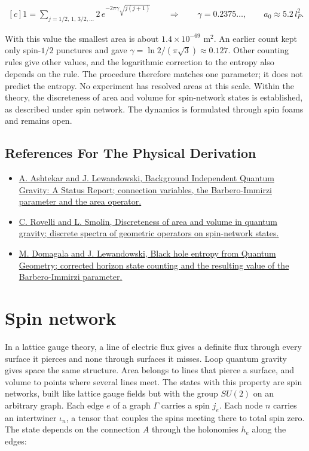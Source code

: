 \documentclass[11pt,oneside]{book}
\newenvironment{centeredalign}{\[\begin{gathered}[c]}{\end{gathered}\]}
\begin{document}
\begin{centeredalign}
1=\sum_{j=1/2,\,1,\,3/2,\ldots}2\,e^{-2\pi\gamma\sqrt{j(j+1)}}
\qquad\Rightarrow\qquad \gamma=0.2375\ldots,\qquad a_0\approx5.2\,l_P^2.
\end{centeredalign}

With this value the smallest area is about \(1.4\times10^{-69}\) m\(^2\). An earlier count kept only spin-\(1/2\) punctures and gave \(\gamma=\ln2/(\pi\sqrt3)\approx0.127\). Other counting rules give other values, and the logarithmic correction to the entropy also depends on the rule. The procedure therefore matches one parameter; it does not predict the entropy. No experiment has resolved areas at this scale. Within the theory, the discreteness of area and volume for spin-network states is established, as described under spin network. The dynamics is formulated through spin foams and remains open.

\subsection*{References For The Physical Derivation}
\begin{itemize}
\item \href{https://arxiv.org/abs/gr-qc/0404018}{A. Ashtekar and J. Lewandowski, Background Independent Quantum Gravity: A Status Report; connection variables, the Barbero-Immirzi parameter and the area operator.}
\item \href{https://arxiv.org/abs/gr-qc/9411005}{C. Rovelli and L. Smolin, Discreteness of area and volume in quantum gravity; discrete spectra of geometric operators on spin-network states.}
\item \href{https://arxiv.org/abs/gr-qc/0407051}{M. Domagala and J. Lewandowski, Black hole entropy from Quantum Geometry; corrected horizon state counting and the resulting value of the Barbero-Immirzi parameter.}
\end{itemize}





\clearpage

\section{Spin network}

\label{topic:spin-network}

In a lattice gauge theory, a line of electric flux gives a definite flux through every surface it pierces and none through surfaces it misses. Loop quantum gravity gives space the same structure. Area belongs to lines that pierce a surface, and volume to points where several lines meet. The states with this property are spin networks, built like lattice gauge fields but with the group \(SU(2)\) on an arbitrary graph. Each edge \(e\) of a graph \(\Gamma\) carries a spin \(j_e\). Each node \(n\) carries an intertwiner \(\iota_n\), a tensor that couples the spins meeting there to total spin zero. The state depends on the connection \(A\) through the holonomies \(h_e\) along the edges:
\end{document}
